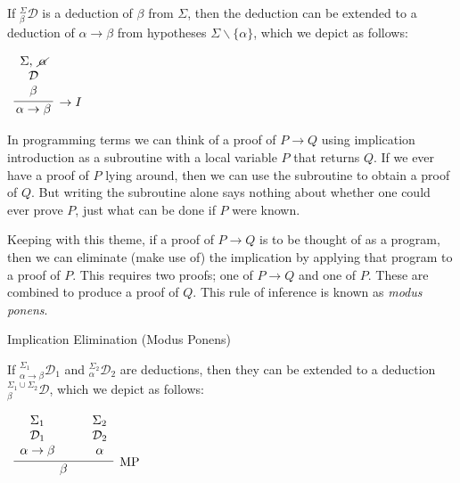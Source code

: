 \documentclass{book}
\begin{document}
    
        If $^{\Sigma}_{\beta}\mathcal{D}$ is a deduction of $\beta$ from $\Sigma$, then the deduction can be extended to a deduction of $\alpha \rightarrow \beta$ from hypotheses $\Sigma \backslash \{\alpha\}$, which we depict as follows: 

        \begin{center}
            $\begin{array}{c}		
                \infer[\rightarrow I]{\alpha \rightarrow \beta}
                    {\begin{array}{c} \Sigma, \ \cancel{\alpha} \\ \mathcal{D} \\ \beta \end{array}}
            \end{array}$
        \end{center}
    

    In programming terms we can think of a proof of $P \to Q$ using implication introduction as a subroutine with a local variable $P$ that returns $Q$. If we ever have a proof of $P$ lying around, then we can use the subroutine to obtain a proof of $Q$. But writing the subroutine alone says nothing about whether one could ever prove $P$, just what can be done if $P$ were known. 

    Keeping with this theme, if a proof of $P \to Q$ is to be thought of as a program, then we can eliminate (make use of) the implication by applying that program to a proof of $P$. This requires two proofs; one of $P \to Q$ and one of $P$. These are combined to produce a proof of $Q$. This rule of inference is known as \emph{modus ponens}.

    \vspace{0.1cm}
    
    {Implication Elimination (Modus Ponens)}

        If $^{\Sigma_{1}}_{\alpha \rightarrow \beta}\mathcal{D}_{1}$ and $^{\Sigma_{2}}_{\alpha}\mathcal{D}_{2}$ are deductions, then they can be extended to a deduction $^{\Sigma_{1}\cup \Sigma_{2}}_{\beta}\mathcal{D}$, which we depict as follows: 

        \begin{center}
            $\begin{array}{c}		
                \infer[\MP]{\beta}{\begin{array}{c} \Sigma_{1} \\ \mathcal{D}_{1} \\ \alpha \rightarrow \beta \end{array} \quad & \begin{array}{c} \Sigma_{2} \\ \mathcal{D}_{2} \\ \alpha \end{array}}	
            \end{array}$
        \end{center}
    
\end{document}
